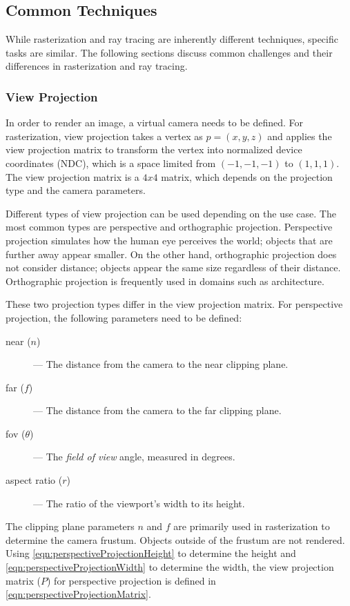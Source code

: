 \subsection{Common Techniques}

While rasterization and ray tracing are inherently different techniques, specific tasks are similar. The following sections discuss common challenges and their differences in rasterization and ray tracing.

\subsubsection{View Projection}
\label{sec:viewProjection}

In order to render an image, a virtual camera needs to be defined. For rasterization, view projection takes a vertex as $p = (x, y, z)$ and applies the view projection matrix to transform the vertex into normalized device coordinates (NDC), which is a space limited from $(-1, -1, -1)$ to $(1, 1, 1)$. The view projection matrix is a $4x4$ matrix, which depends on the projection type and the camera parameters.

Different types of view projection can be used depending on the use case. The most common types are perspective and orthographic projection. Perspective projection simulates how the human eye perceives the world; objects that are further away appear smaller. On the other hand, orthographic projection does not consider distance; objects appear the same size regardless of their distance. Orthographic projection is frequently used in domains such as architecture.

These two projection types differ in the view projection matrix. For perspective projection, the following parameters need to be defined:

\begin{description}
  \item[near ($n$)] — The distance from the camera to the near clipping plane.
  \item[far ($f$)] — The distance from the camera to the far clipping plane.
  \item[fov ($\theta$)] — The \textit{field of view} angle, measured in degrees.
  \item[aspect ratio ($r$)] — The ratio of the viewport's width to its height.
\end{description}

The clipping plane parameters $n$ and $f$ are primarily used in rasterization to determine the camera frustum. Objects outside of the frustum are not rendered. Using \autoref{eqn:perspectiveProjectionHeight} to determine the height and \autoref{eqn:perspectiveProjectionWidth} to determine the width, the view projection matrix ($P$) for perspective projection is defined in \autoref{eqn:perspectiveProjectionMatrix}.

